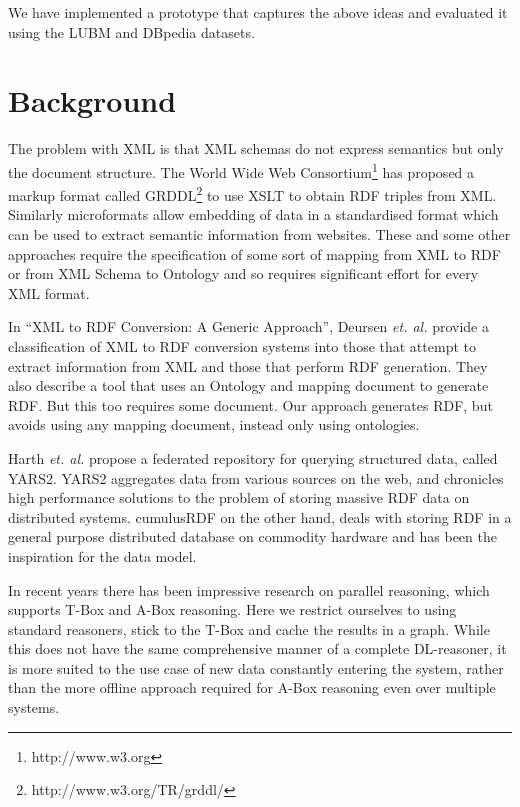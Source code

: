 \documentclass[journal]{IEEEtran}
\begin{document}
We have implemented a prototype that captures the above ideas and evaluated it
using the LUBM\cite{Guo05lubm} and DBpedia\cite{Auer07dbpedia} datasets.

\section{Background}
\label{sec:background}

The problem with XML is that XML schemas do not express semantics but only the
document structure.  The World Wide Web Consortium\footnote{http://www.w3.org}
has proposed a markup format called GRDDL\footnote{http://www.w3.org/TR/grddl/}
to use XSLT to obtain RDF triples from XML. Similarly
microformats\cite{Khare:06} allow embedding of data in a standardised format
which can be used to extract semantic information from websites. These and some
other approaches\cite{Lange09krextor}\cite{Akh08xsp} require the specification
of some sort of mapping from XML to RDF or from XML Schema to Ontology and so
requires significant effort for every XML format.

In ``XML to RDF Conversion: A Generic Approach''\cite{Deur08xml},  Deursen
\emph{et. al.} provide a classification of XML to RDF conversion systems into
those that attempt to extract information from XML and those that perform RDF
generation. They also describe a tool that uses an Ontology and mapping
document to generate RDF. But this too requires some document. Our approach
generates RDF, but avoids using any mapping document, instead only using
ontologies.

Harth \emph{et. al.} propose a federated repository for querying structured
data, called YARS2\cite{Harth07yars2}. YARS2 aggregates data from various
sources on the web, and chronicles high performance solutions to the problem of
storing massive RDF data on distributed systems. cumulusRDF\cite{ladwig:11} on
the other hand, deals with storing RDF in a general purpose distributed
database on commodity hardware and has been the inspiration for the data model.

In recent years there has been impressive research on parallel
reasoning\cite{Weaver09par}\cite{Urb09sca}, which supports T-Box and A-Box
reasoning. Here we restrict ourselves to using standard reasoners, stick to the
T-Box and cache the results in a graph. While this does not have the same
comprehensive manner of a complete DL-reasoner, it is more suited to the use
case of new data constantly entering the system, rather than the more offline
approach required for A-Box reasoning even over multiple systems.
\end{document}
